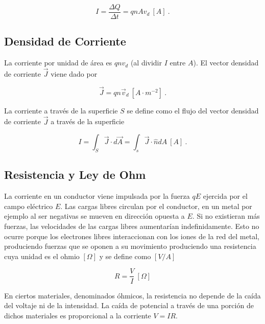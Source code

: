 \documentclass{tufte-handout}
\begin{document}
\begin{equation}
I = \frac{\Delta Q}{\Delta t} = qnAv_d~[A]~.
\end{equation}

\subsection{Densidad de Corriente}

La corriente por unidad de área es $qnv_d$ (al dividir $I$ entre $A$). El vector densidad de corriente $\vec{J}$ viene dado por

\begin{equation}
\vec{J} = qn\vec{v}_d~[A\cdot m^{-2}]~.
\end{equation}

La corriente a través de la superficie $S$ se define como el flujo del vector densidad de corriente $\vec{J}$ a través de la superficie


\begin{equation}
I = \int_S \vec{J}\cdot d\vec{A} = \int_s \vec{J}\cdot\hat{n}dA ~ [A]~.
\end{equation}

\subsection{Resistencia y Ley de Ohm}

La corriente en un conductor viene impulsada por la fuerza $qE$ ejercida por el campo eléctrico $E$. Las cargas libres circulan por el conductor, en un metal por ejemplo al ser negativas se mueven en dirección opuesta a $E$. Si no existieran más fuerzas, las velocidades de las cargas libres aumentarían indefinidamente. Esto no ocurre porque los electrones libres interaccionan con los iones de la red del metal, produciendo fuerzas que se oponen a su movimiento produciendo una resistencia cuya unidad es el ohmio $[\Omega]$ y se define como $[V/A]$

\begin{equation}
R = \frac{V}{I}~[\Omega]
\end{equation}

En ciertos materiales, denominados óhmicos, la resistencia no depende de la caída del voltaje ni de la intensidad. La caída de potencial a través de una porción de dichos materiales es proporcional a la corriente $V = IR$.
\end{document}
